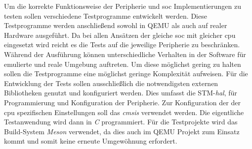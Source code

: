 Um die korrekte Funktionsweise der Peripherie und \ac{soc} Implementierungen zu
testen sollen verschiedene Testprogramme entwickelt werden.
Diese Testprogramme werden anschließend sowohl in QEMU als auch auf realer
Hardware ausgeführt.
Da bei allen Ansätzen der gleiche \ac{soc} mit gleicher \ac{cpu} eingesetzt
wird reicht es die Tests auf die jeweilige Peripherie zu beschränken.
Während der Ausführung können unterschiedliche Verhalten in der Software für
emulierte und reale Umgebung auftreten.
Um diese möglichst gering zu halten sollen die Testprogramme eine möglichst
geringe Komplexität aufweisen.
\newline
Für die Entwicklung der Tests sollen ausschließlich die notwendigsten externen
Bibliotheken genutzt und konfiguriert werden.
Dies umfasst die STM-\textit{\ac{hal}}, für Programmierung und Konfiguration
der Peripherie.
Zur Konfiguration der der \ac{cpu} spezifischen
Einstellungen soll das \textit{\ac{cmsis}} verwendet werden.
Die eigentliche Testanwendung wird dann in \textit{C} programmiert.
Für die Testprojekte wird das Build-System \textit{Meson} verwendet, da dies
auch im QEMU Projekt zum Einsatz kommt und somit keine erneute Umgewöhnung
erfordert.
